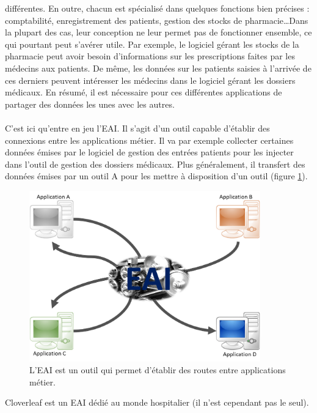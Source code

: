 			différentes. En outre, chacun est spécialisé dans quelques fonctions
			bien précises : comptabilité, enregistrement des patients, gestion des
			stocks de pharmacie\ldots Dans la plupart des cas, leur conception ne leur
			permet pas de fonctionner ensemble, ce qui pourtant peut s'avérer utile. Par
			exemple, le logiciel gérant les stocks de la pharmacie peut avoir besoin
			d'informations sur les prescriptions faites par les médecins aux patients. De
			même, les données sur les patients saisies à l'arrivée de ces derniers
			peuvent intéresser les médecins dans le logiciel gérant les dossiers
			médicaux. En résumé, il est nécessaire pour ces différentes applications de
			partager des données les unes avec les autres.
			
			\paragraph{}%
			C'est ici qu'entre en jeu l'EAI. Il s'agit d'un outil capable d'établir des
			connexions entre les applications métier. Il va par exemple collecter
			certaines données émises par le logiciel de gestion des entrées patients
			pour les injecter dans l'outil de gestion des dossiers médicaux. Plus
			généralement, il transfert des données émises par un outil A pour les
			mettre à disposition d'un outil (figure \ref{intro_interop}).
			\begin{figure}[H]
				\centering
				\includegraphics[width=10cm]{../img/eai_1.png}
				\caption{\label{intro_interop} L'EAI est un outil qui permet
				d'établir des routes entre applications métier.}
			\end{figure}
			Cloverleaf est un EAI dédié au monde hospitalier (il n'est cependant pas le
			seul).
			
